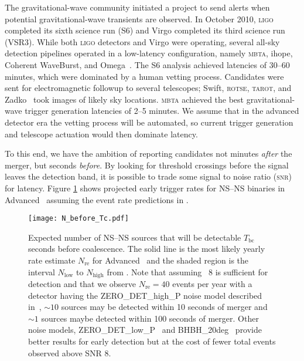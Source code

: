  The gravitational-wave community initiated a project to send alerts when
potential gravitational-wave transients are observed.  In October 2010, \textsc{ligo} completed its sixth science run (S6) and Virgo
completed its third science run (VSR3).  While both \textsc{ligo} detectors and Virgo were
operating, several all-sky detection pipelines operated in a low-latency
configuration, namely \textsc{mbta}, ihope, Coherent WaveBurst, and Omega~\cite{HugheyGWPAW2011, S6lowlatency}.  The S6 analysis achieved latencies of 30--60 minutes, which were
dominated by a human vetting process. Candidates were sent for
electromagnetic followup to several telescopes; Swift,
\textsc{rotse}, \textsc{tarot}, and Zadko~\cite{kanner2008, HugheyGWPAW2011} took images of likely sky locations.  \textsc{mbta} achieved the best gravitational-wave trigger
generation latencies of 2--5 minutes.  We assume that
in the advanced detector era the vetting process will be automated, so current
trigger generation and telescope actuation would then dominate latency.

To this end, we have the ambition of reporting candidates not minutes \emph{after} the merger, but seconds \emph{before}.  By looking for threshold crossings before the signal leaves the detection band, it is possible to trade some signal to noise ratio (\textsc{snr}) for latency.  Figure \ref{fig:earlywarning} shows projected early trigger rates for NS--NS binaries in Advanced \LIGO\
assuming the event rate predictions in \cite{Abadie:2010p10836}.
%
\begin{figure}
\texttt{[image: N\_before\_Tc.pdf]}
\caption{\label{fig:earlywarning} Expected number of NS--NS sources that will
be detectable $T_\mathrm{bc}$ seconds before coalescence.  The solid line is the most
likely yearly rate estimate $N_{\mathrm{re}}$ for Advanced \LIGO\ and the
shaded region is the interval $N_{\mathrm{low}}$ to $N_{\mathrm{high}}$ from
\cite{Abadie:2010p10836}.  Note that assuming \SNR\ 8 is sufficient for
detection and that we observe $N_{\mathrm{re}} = 40$ events per year with a
detector having the ZERO\_DET\_high\_P noise model described
in~\cite{ALIGONoiseZERO_DET_high_P}, $\sim10$ sources may be detected within 10
seconds of merger and $\sim1$ sources maybe detected within 100 seconds of
merger.  Other noise models, ZERO\_DET\_low\_P~\cite{ALIGONoiseZERO_DET_low_P}
and BHBH\_20deg~\cite{ALIGONoiseBHBH_20deg} provide better results for early
detection but at the cost of fewer total events observed above SNR 8.}
\end{figure}


